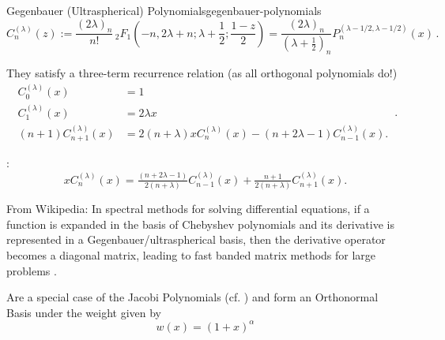 \begin{definition}{Gegenbauer (Ultraspherical) Polynomials}{gegenbauer-polynomials}
  $$C_{n}^{{( \lambda )}}(z) := {\frac  {(2\lambda )_{n}}{n!}}\,_{2}F_{1}\left(-n,2\lambda +n;\lambda +{\frac  {1}{2}};{\frac  {1-z}{2}}\right) = {\frac  {(2\lambda )_{n}}{(\lambda +{\frac  {1}{2}})_{{n}}}}P_{n}^{{(\lambda -1/2,\lambda -1/2)}}(x)\,.$$
\end{definition}

They satisfy a three-term recurrence relation (as all orthogonal polynomials do!)
$${ {\begin{aligned}C_{0}^{(\lambda )}(x)&=1\\C_{1}^{(\lambda )}(x)&=2\lambda x\\(n+1)C_{n+1}^{(\lambda )}(x)&=2(n+\lambda )xC_{n}^{(\lambda )}(x)-(n+2\lambda -1)C_{n-1}^{(\lambda )}(x).\end{aligned}}}\,.$$

\cite[18.9.1]{2018-nist}:
\begin{equation}\label{eq:ultraspherical-rec}
  x C_n^{(\lambda)}(x) = \tfrac{(n+2\lambda-1)}{2(n+\lambda)}C_{n-1}^{(\lambda)}(x) + \tfrac{n+1}{2(n+\lambda)}C_{n+1}^{(\lambda)}(x).
\end{equation}

From Wikipedia: In spectral methods for solving differential equations, if a function is expanded in the basis of Chebyshev polynomials and its derivative is represented in a Gegenbauer/ultraspherical basis, then the derivative operator becomes a diagonal matrix, leading to fast banded matrix methods for large problems \parencite{2013-a-fast-and-well-conditioned-spectral-method}.

Are a special case of the Jacobi Polynomials (cf. ) and form an
Orthonormal Basis under the weight given by
\[w(x)=(1+x)^\alpha\]
